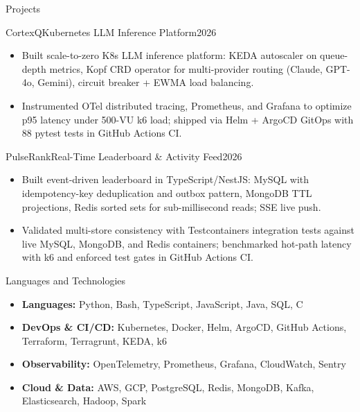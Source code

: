 \documentclass[]{mcdowellcv}
\begin{document}
\begin{cvsection}{Projects}
  \begin{cvsubsection}{CortexQ}{Kubernetes LLM Inference Platform}{2026}
    \begin{itemize}
      \item Built scale-to-zero K8s LLM inference platform: KEDA autoscaler on queue-depth metrics, Kopf CRD operator for multi-provider routing (Claude, GPT-4o, Gemini), circuit breaker + EWMA load balancing.
      \item Instrumented OTel distributed tracing, Prometheus, and Grafana to optimize p95 latency under 500-VU k6 load; shipped via Helm + ArgoCD GitOps with 88 pytest tests in GitHub Actions CI.
    \end{itemize}
    \vspace{-1.5pt}
  \end{cvsubsection}

  \begin{cvsubsection}{PulseRank}{Real-Time Leaderboard \& Activity Feed}{2026}
    \begin{itemize}
      \item Built event-driven leaderboard in TypeScript/NestJS: MySQL with idempotency-key deduplication and outbox pattern, MongoDB TTL projections, Redis sorted sets for sub-millisecond reads; SSE live push.
      \item Validated multi-store consistency with Testcontainers integration tests against live MySQL, MongoDB, and Redis containers; benchmarked hot-path latency with k6 and enforced test gates in GitHub Actions CI.
    \end{itemize}
  \end{cvsubsection}

\end{cvsection}

\begin{cvsection}{Languages and Technologies}
  \begin{cvsubsection}{}{}{}
    \begin{itemize}
      \item \textbf{Languages:} Python, Bash, TypeScript, JavaScript, Java, SQL, C
      \item \textbf{DevOps \& CI/CD:} Kubernetes, Docker, Helm, ArgoCD, GitHub Actions, Terraform, Terragrunt, KEDA, k6
      \item \textbf{Observability:} OpenTelemetry, Prometheus, Grafana, CloudWatch, Sentry
      \item \textbf{Cloud \& Data:} AWS, GCP, PostgreSQL, Redis, MongoDB, Kafka, Elasticsearch, Hadoop, Spark
    \end{itemize}
  \end{cvsubsection}
\end{cvsection}
\end{document}
